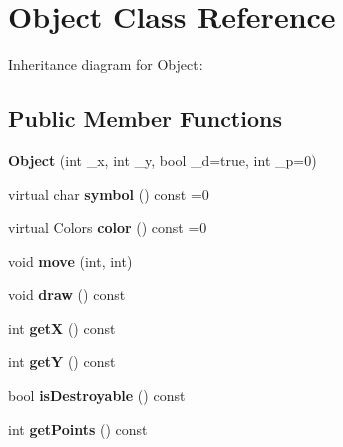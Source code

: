 \hypertarget{class_object}{}\section{Object Class Reference}
\label{class_object}


Inheritance diagram for Object\+:
\subsection*{Public Member Functions}
\begin{DoxyCompactItemize}
\item 
\mbox{\label{class_object_a244d46186e6a61b90ca593ae03cf8bd8}} 
{\bfseries Object} (int \+\_\+x, int \+\_\+y, bool \+\_\+d=true, int \+\_\+p=0)
\item 
\mbox{\label{class_object_ae4b73a42d9ff7415e2bb30837e3f9df5}} 
virtual char {\bfseries symbol} () const =0
\item 
\mbox{\label{class_object_a77d84f2e6c0d460f339842c1b2ba3276}} 
virtual Colors {\bfseries color} () const =0
\item 
\mbox{\label{class_object_a74c72818d62075c01acbdbd046f4443f}} 
void {\bfseries move} (int, int)
\item 
\mbox{\label{class_object_a6c2e37dbcf63b2319924f46a8b4f4ac7}} 
void {\bfseries draw} () const
\item 
\mbox{\label{class_object_a66bac5f818d4d7c05aa457e246e4ca7b}} 
int {\bfseries getX} () const
\item 
\mbox{\label{class_object_a81accadc2226d0e6c41c09dccc7a5f5e}} 
int {\bfseries getY} () const
\item 
\mbox{\label{class_object_a1aa4e20a6d0ae8db29646274f3085ced}} 
bool {\bfseries is\+Destroyable} () const
\item 
\mbox{\label{class_object_a555148cd05b5b98d4d18b4cc5dc06a37}} 
int {\bfseries get\+Points} () const
\end{DoxyCompactItemize}

